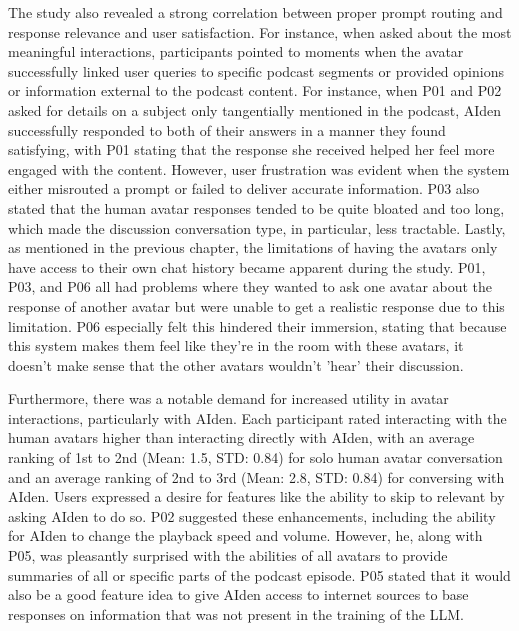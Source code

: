 \documentclass[12pt]{report}
\begin{document}
\begin{myfont}
        \indent The study also revealed a strong correlation between proper prompt routing and response relevance and user satisfaction. For instance, when asked about the most meaningful interactions, participants pointed to moments when the avatar successfully linked user queries to specific podcast segments or provided opinions or information external to the podcast content. For instance, when P01 and P02 asked for details on a subject only tangentially mentioned in the podcast, AIden successfully responded to both of their answers in a manner they found satisfying, with P01 stating that the response she received helped her feel more engaged with the content. However, user frustration was evident when the system either misrouted a prompt or failed to deliver accurate information. P03 also stated that the human avatar responses tended to be quite bloated and too long, which made the discussion conversation type, in particular, less tractable. Lastly, as mentioned in the previous chapter, the limitations of having the avatars only have access to their own chat history became apparent during the study. P01, P03, and P06 all had problems where they wanted to ask one avatar about the response of another avatar but were unable to get a realistic response due to this limitation. P06 especially felt this hindered their immersion, stating that because this system makes them feel like they're in the room with these avatars, it doesn't make sense that the other avatars wouldn't 'hear' their discussion. 

        \indent Furthermore, there was a notable demand for increased utility in avatar interactions, particularly with AIden. Each participant rated interacting with the human avatars higher than interacting directly with AIden, with an average ranking of 1st to 2nd (Mean: 1.5, STD: 0.84) for solo human avatar conversation and an average ranking of 2nd to 3rd (Mean: 2.8, STD: 0.84) for conversing with AIden. Users expressed a desire for features like the ability to skip to relevant by asking AIden to do so. P02 suggested these enhancements, including the ability for AIden to change the playback speed and volume. However, he, along with P05, was pleasantly surprised with the abilities of all avatars to provide summaries of all or specific parts of the podcast episode. P05 stated that it would also be a good feature idea to give AIden access to internet sources to base responses on information that was not present in the training of the LLM.


\end{myfont}
\end{document}
